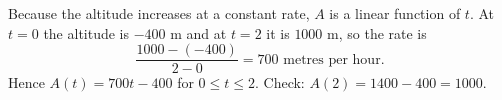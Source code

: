 Because the altitude increases at a constant rate, $A$ is a linear function of $t$. At $t=0$ the altitude is $-400$ m and at $t=2$ it is $1000$ m, so the rate is
\[
\dfrac{1000-(-400)}{2-0}=700\text{ metres per hour}.
\]
Hence $\boxed{A(t)=700t-400}$ for $0\le t\le2$. Check: $A(2)=1400-400=1000$.
